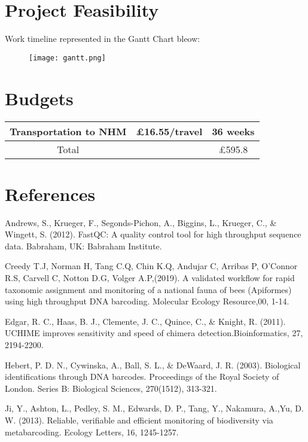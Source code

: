 \documentclass[11pt, a4paper]{article}
\begin{document}
\section*{Project Feasibility}
Work timeline represented in the Gantt Chart bleow:
\begin{figure}[h!]
	\centering\texttt{[image: gantt.png]}
\end{figure}

\section*{Budgets}
\begin{tabular}{|c|c|c|}
\hline
Transportation to NHM&\pounds 16.55/travel&36 weeks\\
\hline
Total& &\pounds 595.8\\
\hline
\end{tabular}

\clearpage
\section*{References}

\vspace{0.5\baselineskip}
Andrews, S., Krueger, F., Segonds-Pichon, A., Biggins, L., Krueger, C., & Wingett, S. (2012). FastQC: A quality control tool for high throughput sequence data. Babraham, UK: Babraham Institute.

\vspace{0.5\baselineskip}
Creedy T.J, Norman H, Tang C.Q, Chin K.Q, Andujar C, Arribas P, O'Connor R.S, Carvell C, Notton D.G, Volger A.P,(2019). A validated workflow for rapid taxonomic assignment and monitoring of a national fauna of bees (Apiformes) using high throughput DNA barcoding. Molecular Ecology Resource,00, 1-14.

\vspace{0.5\baselineskip}
Edgar, R. C., Haas, B. J., Clemente, J. C., Quince, C., & Knight, R. (2011). UCHIME improves sensitivity and speed of chimera detection.Bioinformatics, 27, 2194-2200. 

\vspace{0.5\baselineskip}
Hebert, P. D. N., Cywinska, A., Ball, S. L., & DeWaard, J. R. (2003). Biological identifications through DNA barcodes. Proceedings of the Royal Society of London. Series B: Biological Sciences, 270(1512), 313-321.

\vspace{0.5\baselineskip}
Ji, Y., Ashton, L., Pedley, S. M., Edwards, D. P., Tang, Y., Nakamura, A.,Yu, D. W. (2013). Reliable, verifiable and efficient monitoring of biodiversity via metabarcoding. Ecology Letters, 16, 1245-1257.
\end{document}
